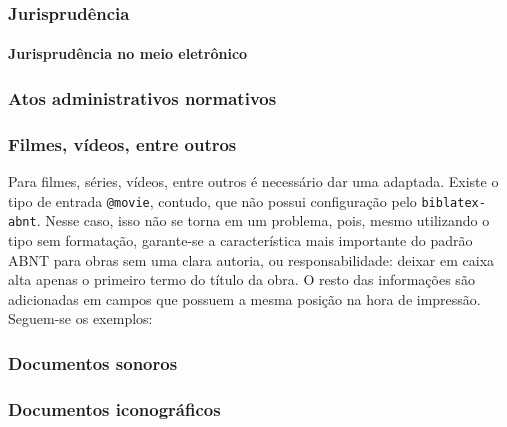 \subsubsection{Jurisprudência}


\paragraph{Jurisprudência no meio eletrônico}

\subsubsection{Atos administrativos normativos}


\subsubsection{Filmes, vídeos, entre outros}
Para filmes, séries, vídeos, entre outros é necessário dar uma adaptada. Existe o tipo de entrada \texttt{@movie}, contudo, que não possui configuração pelo \texttt{biblatex-abnt}. Nesse caso, isso não se torna em um problema, pois, mesmo utilizando o tipo sem formatação, garante-se a característica mais importante do padrão ABNT para obras sem uma clara autoria, ou responsabilidade: deixar em caixa alta apenas o primeiro termo do título da obra. O resto das informações são adicionadas em campos que possuem a mesma posição na hora de impressão. Seguem-se os exemplos:




\subsubsection{Documentos sonoros}




\subsubsection{Documentos iconográficos}

